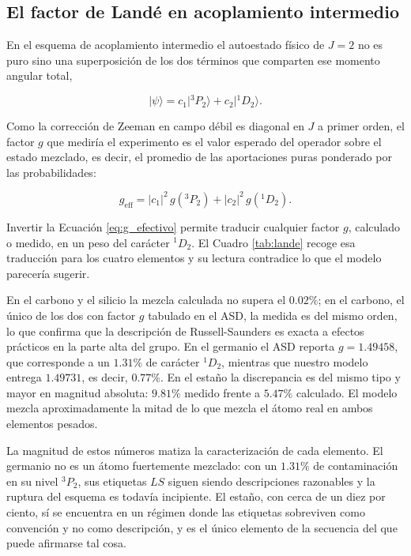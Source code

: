 \subsection{El factor de Landé en acoplamiento intermedio}

En el esquema de acoplamiento intermedio el autoestado físico de $J=2$ no es puro sino una superposición de los dos términos que comparten ese momento angular total,

\begin{equation}
    | \psi \rangle = c_1 | {}^3P_2 \rangle + c_2 | {}^1D_2 \rangle .
\end{equation}

Como la corrección de Zeeman en campo débil es diagonal en $J$ a primer orden, el factor $g$ que mediría el experimento es el valor esperado del operador sobre el estado mezclado, es decir, el promedio de las aportaciones puras ponderado por las probabilidades:

\begin{equation}
    \label{eq:g_efectivo}
    g_{\text{eff}} = |c_1|^2\, g(^3P_2) + |c_2|^2\, g(^1D_2).
\end{equation}

Invertir la Ecuación \eqref{eq:g_efectivo} permite traducir cualquier factor $g$, calculado o medido, en un peso del carácter $^1D_2$. El Cuadro \ref{tab:lande} recoge esa traducción para los cuatro elementos y su lectura contradice lo que el modelo parecería sugerir.

En el carbono y el silicio la mezcla calculada no supera el $0.02\%$; en el carbono, el único de los dos con factor $g$ tabulado en el ASD, la medida es del mismo orden, lo que confirma que la descripción de Russell-Saunders es exacta a efectos prácticos en la parte alta del grupo. En el germanio el ASD reporta $g = 1.49458$, que corresponde a un $1.31\%$ de carácter $^1D_2$, mientras que nuestro modelo entrega $1.49731$, es decir, $0.77\%$. En el estaño la discrepancia es del mismo tipo y mayor en magnitud absoluta: $9.81\%$ medido frente a $5.47\%$ calculado. El modelo mezcla aproximadamente la mitad de lo que mezcla el átomo real en ambos elementos pesados.

La magnitud de estos números matiza la caracterización de cada elemento. El germanio no es un átomo fuertemente mezclado: con un $1.31\%$ de contaminación en su nivel $^3P_2$, sus etiquetas $LS$ siguen siendo descripciones razonables y la ruptura del esquema es todavía incipiente. El estaño, con cerca de un diez por ciento, sí se encuentra en un régimen donde las etiquetas sobreviven como convención y no como descripción, y es el único elemento de la secuencia del que puede afirmarse tal cosa.

